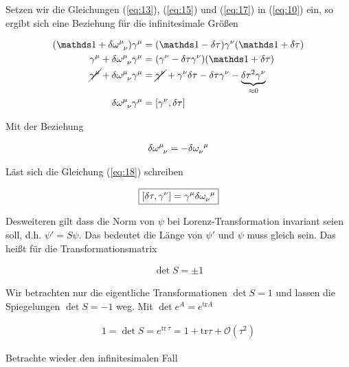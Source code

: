 Setzen wir die Gleichungen (\ref{eq:13}), (\ref{eq:15}) und (\ref{eq:17}) in (\ref{eq:10}) ein, so ergibt sich eine Beziehung für die infinitesimale Größen

\begin{align}
  \label{eq:18}
 (\mathds 1 + \delta\omega^\mu_{\hphantom\mu \nu}) \gamma^\mu &= (\mathds 1 - \delta\tau)\gamma^\nu( \mathds 1 + \delta\tau)\notag \\
 \gamma^\mu + \delta\omega^\mu_{\hphantom\mu \nu} \gamma^\mu &= (\gamma^\nu - \delta\tau\gamma^\nu)( \mathds 1 + \delta\tau)\notag \\
 \cancel{\gamma^\mu} + \delta\omega^\mu_{\hphantom\mu \nu} \gamma^\mu &= \cancel{\gamma^\nu} + \gamma^\nu\delta\tau - \delta\tau\gamma^\nu - \underbr{\delta\tau^2\gamma^\nu}_{\approx 0}\notag \\
 \delta\omega^\mu_{\hphantom\mu \nu} \gamma^\mu &= [\gamma^\nu,\delta\tau]
\end{align}


Mit der Beziehung 

\begin{align}
  \label{eq:19}
  \delta\omega^\mu_{\hphantom\mu \nu} = - \delta\omega^{\hphantom\nu \mu}_\nu
\end{align}

Läst sich die Gleichung (\ref{eq:18}) schreiben

\begin{align}
  \label{eq:20}
  \boxed{[\delta\tau,\gamma^\nu] = \gamma^\mu \delta\omega^{\hphantom\nu \mu}_\nu}
\end{align}

Desweiteren gilt dass die Norm von \(\psi\) bei Lorenz-Transformation invariant seien soll, d.h. \(\psi'=S\psi\). Das bedeutet die Länge von \(\psi'\) und \(\psi\) muss gleich sein. Das  heißt für die Transformationsmatrix

\begin{align}
  \label{eq:21}
  \det S = \pm 1
\end{align}

Wir betrachten nur die eigentliche Transformationen \(\det S = 1\) und lassen die Spiegelungen \(\det S = -1\) weg. Mit \(\det e^{A} = e^{\text{tr} A}\)

\begin{align}
  \label{eq:22}
  1 = \det S = e^{\text{tr}\,\tau} =   1 + \text{tr}\tau + \mathcal O(\tau^2)
\end{align}

Betrachte wieder den infinitesimalen Fall

